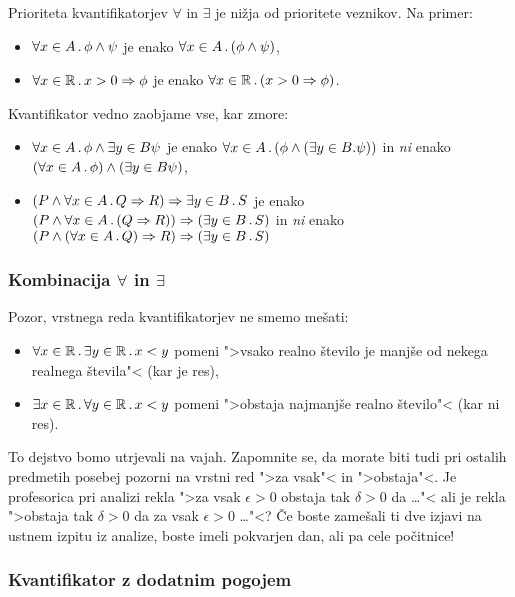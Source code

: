 Prioriteta kvantifikatorjev $\forall$ in $\exists$ je nižja od prioritete veznikov. Na primer:
%
\begin{itemize}
\item $\forall x \in A \,.\, \phi \land \psi$ je enako $\forall x \in A \,.\, (\phi \land \psi)$,
\item $\forall x \in \mathbb{R} \,.\, x > 0 \Rightarrow \phi$ je enako $\forall x \in \mathbb{R} \,.\, (x > 0 \Rightarrow \phi)$.
\end{itemize}
% 
Kvantifikator vedno zaobjame vse, kar zmore:
%
\begin{itemize}
\item $\forall x \in A \,.\, \phi \land \exists{y \in B} \psi$ je enako $\forall x \in A \,.\, (\phi \land (\exists y \in B . \psi))$ in \emph{ni} enako $(\forall x \in A \,.\, \phi) \land (\exists {y \in B} \psi)$,

\item $(P \land \forall x \in A \,.\, Q \Rightarrow R) \Rightarrow \exists y \in B \,.\, S$ je enako $(P \land \forall x \in A \,.\,  (Q \Rightarrow R)) \Rightarrow (\exists y \in B \,.\, S)$ in \emph{ni} enako 
  $(P \land (\forall x \in A \,.\, Q) \Rightarrow R) \Rightarrow (\exists y \in B \,.\, S)$
\end{itemize}

\subsubsection{Kombinacija $\forall$ in $\exists$}

Pozor, vrstnega reda kvantifikatorjev ne smemo mešati:
%
\begin{itemize}
\item $\forall x \in \mathbb{R} \,.\, \exists y \in \mathbb{R} \,.\, x < y$ pomeni ">vsako realno število je manjše od nekega realnega števila"< (kar je res),
\item $\exists x \in \mathbb{R} \,.\, \forall y \in \mathbb{R} \,.\, x < y$ pomeni ">obstaja najmanjše realno število"< (kar ni res).
\end{itemize}
%
To dejstvo bomo utrjevali na vajah. Zapomnite se, da morate biti tudi pri ostalih predmetih posebej pozorni na vrstni red
">za vsak"< in ">obstaja"<. Je profesorica pri analizi rekla ">za vsak $\epsilon > 0$ obstaja tak $\delta > 0$ da \dots"< ali je rekla ">obstaja tak $\delta > 0$ da za vsak $\epsilon > 0$ \dots"<? Če boste zamešali ti dve izjavi na ustnem izpitu iz analize, boste imeli pokvarjen dan, ali pa cele počitnice!


\subsubsection{Kvantifikator z dodatnim pogojem}

